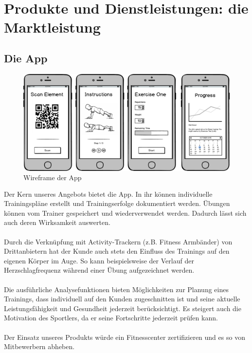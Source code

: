 \clearpage
\section{Produkte und Dienstleistungen: die Marktleistung}

\subsection{Die App}
\begin{figure}[h]
\centering
\includegraphics[width=0.5\linewidth]{images/app}
\caption{Wireframe der App}
\label{fig:app}
\end{figure}
Der Kern unseres Angebots bietet die App. In ihr können individuelle Trainingspläne erstellt und Trainingserfolge dokumentiert werden. Übungen können vom Trainer gespeichert und wiederverwendet werden. Dadurch lässt sich auch deren Wirksamkeit auswerten. \\ \\
Durch die Verknüpfung mit Activity-Trackern (z.B. Fitness Armbänder) von Drittanbietern hat der Kunde auch stets den Einfluss des Trainings auf den eigenen Körper im Auge. So kann beispielsweise der Verlauf der Herzschlagfrequenz während einer Übung aufgezeichnet werden. \\ \\
Die ausführliche Analysefunktionen bieten Möglichkeiten zur Planung eines Trainings, dass individuell auf den Kunden zugeschnitten ist und seine aktuelle Leistungsfähigkeit und Gesundheit jederzeit berücksichtigt. Es steigert auch die Motivation des Sportlers, da er seine Fortschritte jederzeit prüfen kann. \\ \\
Der Einsatz unseres Produkts würde ein Fitnesscenter zertifizieren und es so von Mitbewerbern abheben.

